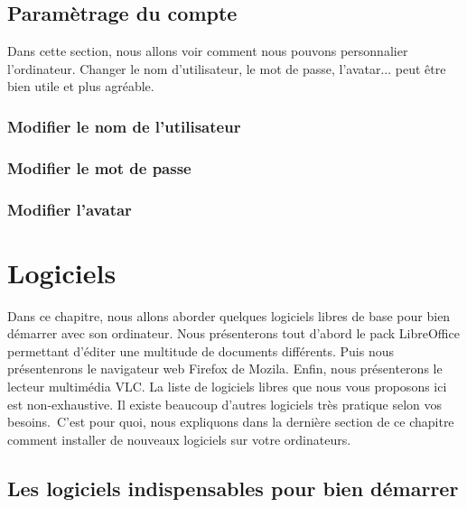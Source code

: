 \documentclass[12pt]{book}
\begin{document}
\section{Paramètrage du compte}
	Dans cette section, nous allons voir comment nous pouvons personnalier l'ordinateur.
	Changer le nom d'utilisateur, le mot de passe, l'avatar... peut être bien utile et plus agréable.\newline
	\subsection{Modifier le nom de l'utilisateur}
	\subsection{Modifier le mot de passe}
	\subsection{Modifier l'avatar}

\chapter{Logiciels}
Dans ce chapitre, nous allons aborder quelques logiciels libres de base pour bien démarrer avec son ordinateur.
Nous présenterons tout d'abord le pack LibreOffice permettant d'éditer une multitude de documents différents.
Puis nous présentenrons le navigateur web Firefox de Mozila.
Enfin, nous présenterons le lecteur multimédia VLC.
La liste de logiciels libres que nous vous proposons ici est non-exhaustive.
Il existe beaucoup d'autres logiciels très pratique selon vos besoins.\
C'est pour quoi, nous expliquons dans la dernière section de ce chapitre comment installer de nouveaux logiciels sur votre ordinateurs.
\section{Les logiciels indispensables pour bien démarrer}
\end{document}
